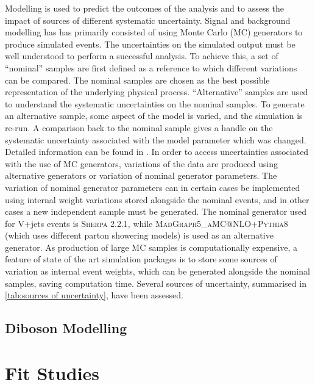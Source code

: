 Modelling is used to predict the outcomes of the analysis and to assess the impact of sources of different systematic uncertainty. Signal and background modelling has has primarily consisted of using Monte Carlo (MC) generators to produce simulated events. The uncertainties on the simulated output must be well understood to perform a successful analysis. To achieve this, a set of ``nominal'' samples are first defined as a reference to which different variations can be compared. The nominal samples are chosen as the best possible representation of the underlying physical process. ``Alternative'' samples are used to understand the systematic uncertainties on the nominal samples. To generate an alternative sample, some aspect of the model is varied, and the simulation is re-run. A comparison back to the nominal sample gives a handle on the systematic uncertainty associated with the model parameter which was changed. Detailed information can be found in \cite{Bell:2316951}. In order to access uncertainties associated with the use of MC generators, variations of the data are produced using alternative generators or variation of nominal generator parameters. The variation of nominal generator parameters can in certain cases be implemented using internal weight variations stored alongside the nominal events, and in other cases a new independent sample must be generated. The nominal generator used for V+jets events is \textsc{Sherpa 2.2.1}, while \textsc{MadGraph5\_aMC@NLO+Pythia8} (which uses different parton showering models) is used as an alternative generator. As production of large MC samples is computationally expensive, a feature of state of the art simulation packages is to store some sources of variation as internal event weights, which can be generated alongside the nominal samples, saving computation time. Several sources of uncertainty, summarised in \cref{tab:sources of uncertainty}, have been assessed.

%

%

\subsection{Diboson Modelling}



\section{Fit Studies}

